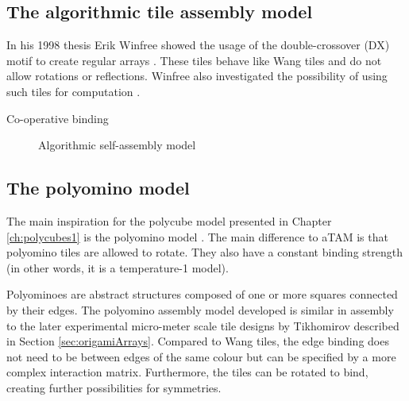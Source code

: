 \subsection{The algorithmic tile assembly model}



In his 1998 thesis Erik Winfree showed the usage of the double-crossover (DX) motif to create regular arrays \cite{winfree1998design}. These tiles behave like Wang tiles\cite{wang1961proving} and do not allow rotations or reflections. Winfree also investigated the possibility of using such tiles for computation \cite{winfree1998algorithmic}.

Co-operative binding

\begin{figure}[h]
  \centering
  \caption{Algorithmic self-assembly model}
\end{figure}

\subsection{The polyomino model}\label{sec:polyomino}

The main inspiration for the polycube model presented in Chapter \ref{ch:polycubes1} is the polyomino model \cite{ahnert2010self}\cite{johnston2011evolutionary}. The main difference to aTAM is that polyomino tiles are allowed to rotate. They also have a constant binding strength (in other words, it is a temperature-1 model).


Polyominoes are abstract structures composed of one or more squares connected by their edges. The polyomino assembly model developed is similar in assembly to the later experimental micro-meter scale tile designs by Tikhomirov \cite{tikhomirov2017fractal} described in Section \ref{sec:origamiArrays}. Compared to Wang tiles\cite{wang1961proving}, the edge binding does not need to be between edges of the same colour but can be specified by a more complex interaction matrix. Furthermore, the tiles can be rotated to bind, creating further possibilities for symmetries.

